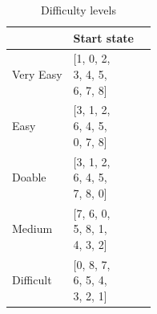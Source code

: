 \documentclass{svproc}
\begin{document}
\begin{table}
	\begin{minipage}[b]{0.30\textwidth}
		\caption{Difficulty levels}
		\label{difficulty}
		\centering
		\begin{tabularx}{\textwidth} { 
				| >{\raggedright\arraybackslash}X 
				| >{\centering\arraybackslash}X 
				| >{\raggedleft\arraybackslash}X | }
			\hline
			{\bf Difficulty level} & {\bf Start state}  \\
			\hline
			Very Easy  & \makecell{[1, 0, 2, \\ 3, 4, 5, \\ 6, 7, 8]} \\
			\hline
			Easy  & \makecell{[3, 1, 2, \\ 6, 4, 5, \\ 0, 7, 8]} \\
			\hline
			Doable  & \makecell{[3, 1, 2, \\6, 4, 5, \\7, 8, 0]} \\
			\hline
			Medium  & \makecell{[7, 6, 0, \\5, 8, 1, \\4, 3, 2]} \\
			\hline
			Difficult  & \makecell{[0, 8, 7, \\6, 5, 4, \\3, 2, 1]} \\
			\hline
		\end{tabularx}
	\end{minipage}\hfill
	\begin{minipage}{0.65\textwidth}
		\centering
		\label{fig:nodes}
	\end{minipage}
\end{table}
\end{document}
